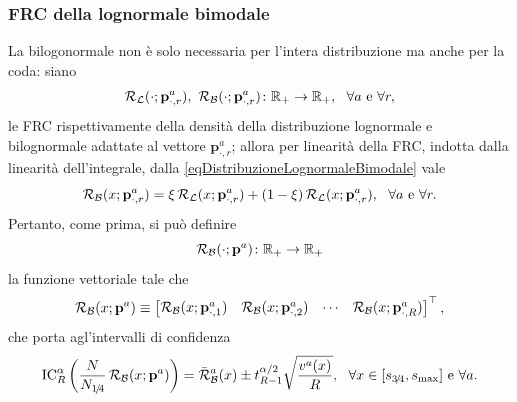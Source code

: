       \subsubsection{FRC della lognormale bimodale}

        La bilogonormale non è solo necessaria per l'intera distribuzione ma anche per la coda: siano
        \begin{equation*}
          \FRC_{\mathcal L}(\cdot;\mathbf p^a_{\cdot,r}),\ 
          \FRC_{\mathcal B}(\cdot;\mathbf p^a_{\cdot,r})
          \colon\RPlus\to\RPlus,
          \ \ \forall a\text{ e }\forall r,
        \end{equation*}
        le FRC rispettivamente della densità della distribuzione lognormale e bilognormale adattate al vettore \(\mathbf p^a_{\cdot,r}\); allora per linearità della FRC, indotta dalla linearità dell'integrale, dalla \cref{eqDistribuzioneLognormaleBimodale} vale
        \begin{equation*}
          \operatorname{\mathcal R}_{\mathcal B}(x;\mathbf p^a_{\cdot,r})
          =\xi\operatorname{\mathcal R}_{\mathcal L}(x;\mathbf p^a_{\cdot,r})
          +(1-\xi)\operatorname{\mathcal R}_{\mathcal L}(x;\mathbf p^a_{\cdot,r}),
          \ \ \forall a\text{ e }\forall r.
        \end{equation*}
        Pertanto, come prima, si può definire
        \begin{equation*}
          \operatorname{\mathcal R}_{\mathcal B}(\cdot;\mathbf p^a)\colon\mathbb R_+\to\mathbb R_+
        \end{equation*}
        la funzione vettoriale tale che
        \begin{equation*}
          \operatorname{\mathcal R}_{\mathcal B}(x;\mathbf p^a)\equiv
          \begin{bmatrix}
            \operatorname{\mathcal R}_{\mathcal B}(x;\mathbf p^a_{\cdot,1})&
            \operatorname{\mathcal R}_{\mathcal B}(x;\mathbf p^a_{\cdot,2})&
            \cdots&
            \operatorname{\mathcal R}_{\mathcal B}(x;\mathbf p^a_{\cdot,R})
          \end{bmatrix}^\top,
        \end{equation*}
        che porta agl'intervalli di confidenza
        \begin{equation*}
          \operatorname{IC}_R^{\alpha}\left(\frac N{N_{1\hspace{-0.15em}/\hspace{-0.15em}4}}\operatorname{\mathcal R}_{\mathcal B}(x;\mathbf p^a)\right)
          =\bar{\operatorname{\mathcal R}}_{\mathcal B}^a(x)\pm t^{\alpha/2}_{R-1}\sqrt{\frac{v^a(x)}R},
          \ \ \forall x\in[s_{3\hspace{-0.15em}/\hspace{-0.15em}4},s_{\max}]\text{ e }\forall a.
        \end{equation*}
    
